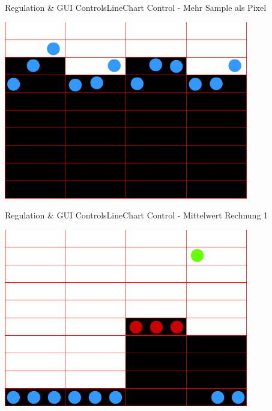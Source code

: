 	\begin{frame}{Regulation \& GUI Controls}{LineChart Control - Mehr Sample als Pixel}
	\begin{center}			
		\includegraphics[width=0.8\textwidth]{../regulation/TooManySamples01.png}
	\end{center}
	\end{frame}

	\begin{frame}{Regulation \& GUI Controls}{LineChart Control - Mittelwert Rechnung 1}
	\begin{center}			
		\includegraphics[width=0.8\textwidth]{../regulation/TooManySamples020001.png}
	\end{center}
	\end{frame}
	
